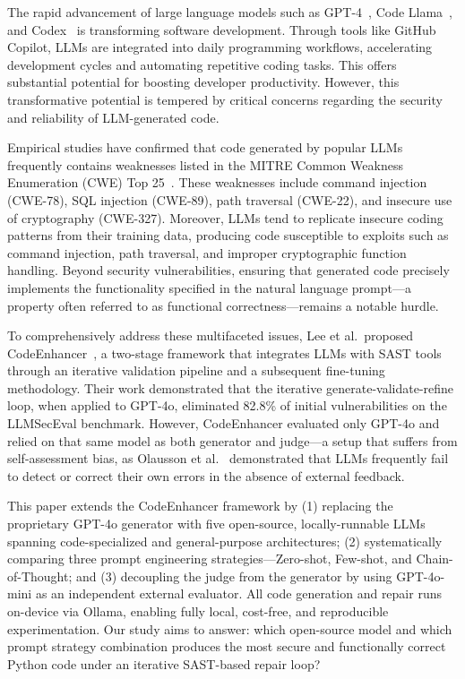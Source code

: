 \documentclass[runningheads]{llncs}
\begin{document}
The rapid advancement of large language models such as GPT-4~\cite{openai2023gpt4}, Code Llama~\cite{roziere2024codellama}, and Codex~\cite{chen2021codex} is transforming software development. Through tools like GitHub Copilot, LLMs are integrated into daily programming workflows, accelerating development cycles and automating repetitive coding tasks. This offers substantial potential for boosting developer productivity. However, this transformative potential is tempered by critical concerns regarding the security and reliability of LLM-generated code.

Empirical studies have confirmed that code generated by popular LLMs frequently contains weaknesses listed in the MITRE Common Weakness Enumeration (CWE) Top 25~\cite{pearce2022asleep,perry2023users}. These weaknesses include command injection (CWE-78), SQL injection (CWE-89), path traversal (CWE-22), and insecure use of cryptography (CWE-327). Moreover, LLMs tend to replicate insecure coding patterns from their training data, producing code susceptible to exploits such as command injection, path traversal, and improper cryptographic function handling. Beyond security vulnerabilities, ensuring that generated code precisely implements the functionality specified in the natural language prompt---a property often referred to as functional correctness---remains a notable hurdle.

To comprehensively address these multifaceted issues, Lee et al.\ proposed CodeEnhancer~\cite{lee2026codeenhancer}, a two-stage framework that integrates LLMs with SAST tools through an iterative validation pipeline and a subsequent fine-tuning methodology. Their work demonstrated that the iterative generate-validate-refine loop, when applied to GPT-4o, eliminated 82.8\% of initial vulnerabilities on the LLMSecEval benchmark. However, CodeEnhancer evaluated only GPT-4o and relied on that same model as both generator and judge---a setup that suffers from self-assessment bias, as Olausson et al.~\cite{olausson2024selfrepair} demonstrated that LLMs frequently fail to detect or correct their own errors in the absence of external feedback.

This paper extends the CodeEnhancer framework by (1) replacing the proprietary GPT-4o generator with five open-source, locally-runnable LLMs spanning code-specialized and general-purpose architectures; (2) systematically comparing three prompt engineering strategies---Zero-shot, Few-shot, and Chain-of-Thought; and (3) decoupling the judge from the generator by using GPT-4o-mini as an independent external evaluator. All code generation and repair runs on-device via Ollama, enabling fully local, cost-free, and reproducible experimentation. Our study aims to answer: which open-source model and which prompt strategy combination produces the most secure and functionally correct Python code under an iterative SAST-based repair loop?
\end{document}
